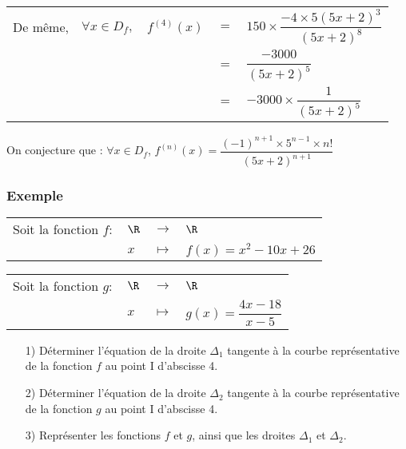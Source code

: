 \begin{tabular}{lllll}
De même,& $\forall x \in D_f,$ & $f^{(4)}(x)$ & $=$ & $150 \times \dfrac{-4 \times 5\left(5x+2\right)^3}{\left(5x+2\right)^8}$ \vspace*{.3cm} \\
& & & $=$ & $\dfrac{-3000}{\left(5x+2\right)^5}$ \vspace*{.3cm} \\
& & & $=$ & $-3000 \times \dfrac{1}{\left(5x+2\right)^5}$ \vspace*{.3cm} \\
\end{tabular}

\vspace*{.3cm} 

On conjecture que : $\forall x \in D_f$, $f^{(n)}(x) =  \dfrac{\left(-1\right)^{n+1} \times 5^{n-1} \times n!}{\left(5x+2\right)^{n+1}}$ \\

\newpage

\subsubsection{Exemple }

\begin{tabular}{llll}
Soit la fonction $f :$ & $\R$ & $\longrightarrow$ & $\R$ \\
& $x$ & $\longmapsto$ & $f(x) = x^2 - 10x + 26$ \\
\end{tabular}

\vspace*{.3cm}

\begin{tabular}{llll}
Soit la fonction $g :$ & $\R$ & $\longrightarrow$ & $\R$ \\
& $x$ & $\longmapsto$ & $g(x) = \dfrac{4x - 18}{x - 5}$ \\
\end{tabular}

\vspace*{.3cm}

\begin{itemize}
\item[1)] Déterminer l'équation de la droite $\Delta_1$ tangente à la courbe représentative de la fonction $f$ au point I d'abscisse 4. \\
\item[2)] Déterminer l'équation de la droite $\Delta_2$ tangente à la courbe représentative de la fonction $g$ au point I d'abscisse 4. \\
\item[3)] Représenter les fonctions $f$ et $g$, ainsi que les droites $\Delta_1$ et $\Delta_2$. \\
\end{itemize}

